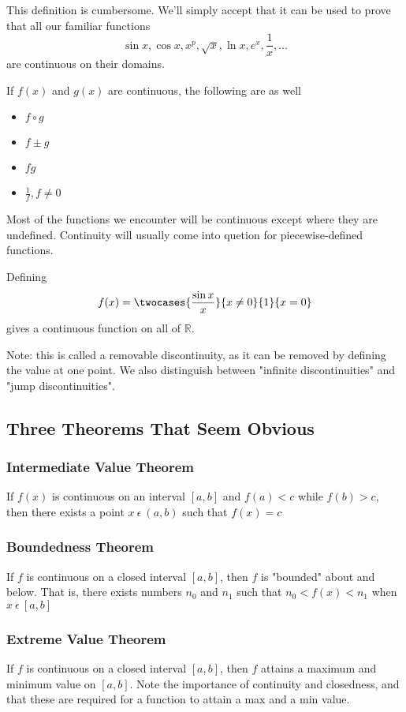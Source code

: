 \documentclass[12pt]{article}
\begin{document}
This definition is cumbersome. We'll simply accept that it can be used to prove that all our familiar functions \[ \sin{x},\cos{x},x^p,\sqrt{x},\ln{x},e^x,\frac{1}{x},... \] are continuous on their domains.

If $f(x)$ and $g(x)$ are continuous, the following are as well
\begin{itemize}
\item $f\circ g$
\item $f\pm g$
\item $fg$
\item $\frac{1}{f}, f\neq 0$
\end{itemize}

Most of the functions we encounter will be continuous except where they are undefined. Continuity will usually come into quetion for piecewise-defined functions.

Defining \[ f(x) = \twocases{\frac{\sin{x}}{x}}{x \neq 0}{1}{x = 0} \] gives a continuous function on all of $\mathbb{R}$.

Note: this is called a removable discontinuity, as it can be removed by defining the value at one point. We also distinguish between "infinite discontinuities" and "jump discontinuities".

\subsection*{Three Theorems That Seem Obvious}
\subsubsection*{Intermediate Value Theorem}
If $f(x)$ is continuous on an interval $[a,b]$ and $f(a) < c$ while $f(b) > c$, then there exists a point $x\ \epsilon\ (a,b)$ such that $f(x) = c$

\subsubsection*{Boundedness Theorem}
If $f$ is continuous on a closed interval $[a,b]$, then $f$ is "bounded" about and below. That is, there exists numbers $n_0$ and $n_1$ such that $n_0 < f(x) < n_1$ when $x\ \epsilon\ [a,b]$

\subsubsection*{Extreme Value Theorem}
If $f$ is continuous on a closed interval $[a,b]$, then $f$ attains a maximum and minimum value on $[a,b]$. Note the importance of continuity and closedness, and that these are required for a function to attain a max and a min value.
\end{document}
